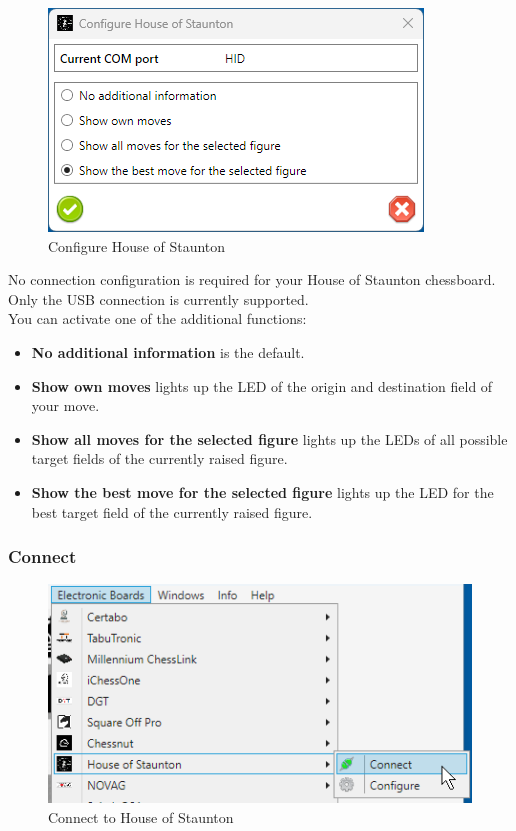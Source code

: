 \documentclass[11pt,a4paper]{article}
\begin{document}
\begin{figure}[H]
	\centering
	\includegraphics[scale=1.0]{HOS2.png}
	\caption{Configure House of Staunton }
	\label{fig:HOS2}
\end{figure}
No connection configuration is required for your House of Staunton chessboard. Only the USB connection is currently supported.\\ 
You can activate one of the additional functions:\\

\begin{itemize}
	\item \textbf{No additional information} is the default.
	\item \textbf{Show own moves} lights up the LED of the origin and destination field of your move.
	\item \textbf{Show all moves for the selected figure} lights up the LEDs of all possible target fields of the currently raised figure.
	\item \textbf{Show the best move for the selected figure} lights up the LED for the best target field of the currently raised figure.
\end{itemize}

\subsubsection{Connect}
\begin{figure}[H]
	\centering
	\includegraphics[scale=1.0]{HOS3.png}
	\caption{Connect to House of Staunton}
	\label{fig:HOS3}
\end{figure}
\end{document}

